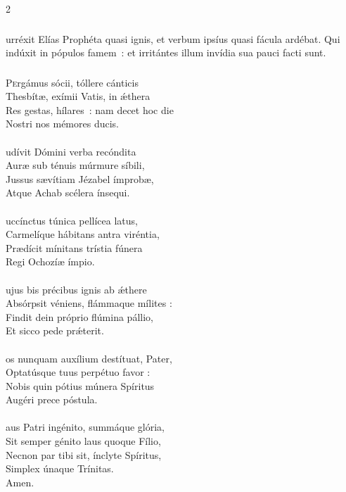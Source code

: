 \documentclass[9pt,twoside]{extarticle}
\begin{document}
\begin{multicols}{2}
{{\subsubsection*{}
urréxit Elías Prophéta quasi ignis, et verbum ipsíus quasi fácula ardébat. Qui indúxit in pópulos famem~: et irritántes illum invídia sua pauci facti sunt.

\subsubsection*{\center {}}
\lettrine{P}ergámus sócii, tóllere cánticis\\
Thesbítæ, exímii Vatis, in ǽthera\\
Res gestas, hílares~: nam decet hoc die\\
Nostri nos mémores ducis.\\
\\
udívit Dómini verba recóndita\\
Auræ sub ténuis múrmure síbili,\\
Jussus sævítiam Jézabel ímprobæ,\\
Atque Achab scélera ínsequi.\\
\\
uccínctus túnica pellícea latus,\\
Carmelíque hábitans antra viréntia,\\
Prædícit mínitans trístia fúnera\\
Regi Ochozíæ ímpio.\\
\\
ujus bis précibus ignis ab ǽthere\\
Absórpsit véniens, flámmaque mílites :\\
Findit dein próprio flúmina pállio,\\
Et sicco pede prǽterit.\\
\\
os nunquam auxílium destítuat, Pater,\\
Optatúsque tuus perpétuo favor :\\
Nobis quin pótius múnera Spíritus\\
Augéri prece póstula.\\
\\
aus Patri ingénito, summáque glória,\\
Sit semper génito laus quoque Fílio,\\
Necnon par tibi sit, ínclyte Spíritus,\\
Simplex únaque Trínitas.\\
Amen.

}}
\end{multicols}
\end{document}
